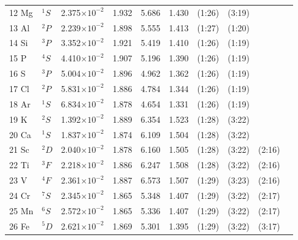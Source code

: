 \begin{longtable}{l l r r r r r r r r}
12 Mg 	&  	$^{1}S$  	&   	2.375$\times10^{-2}$   	&    	1.932    	&    	5.686    	&    	1.430    	&    	(1:26)    	&    	(3:19)    	\\
13 Al 	&  	$^{2}P$  	&   	2.239$\times10^{-2}$   	&    	1.898    	&    	5.555    	&    	1.413    	&    	(1:27)    	&    	(1:20)    	 \\
14 Si 	&  	$^{3}P$  	&   	3.352$\times10^{-2}$   	&    	1.921    	&    	5.419    	&    	1.410    	&    	(1:26)    	&    	(1:19)    	 \\
15 P 		&  	$^{4}S$  	&   	4.410$\times10^{-2}$   	&    	1.907    	&    	5.196    	&    	1.390    	&    	(1:26)    	&    	(1:19)    	    \\
16 S 		&  	$^{3}P$  	&   	5.004$\times10^{-2}$   	&    	1.896    	&    	4.962    	&    	1.362    	&    	(1:26)    	&    	(1:19)    	    \\
17 Cl 	&  	$^{2}P$  	&   	5.831$\times10^{-2}$   	&    	1.886    	&    	4.784    	&    	1.344    	&    	(1:26)    	&    	(1:19)    	    \\
18 Ar 	&  	$^{1}S$   	&   	6.834$\times10^{-2}$   	&    	1.878    	&    	4.654    	&    	1.331    	&    	(1:26)    	&    	(1:19)    	    \\
19 K 		&  	$^{2}S$   	&   	1.392$\times10^{-2}$   	&    	1.889    	&    	6.354    	&    	1.523    	&    	(1:28)    	&    	(3:22)    	    \\
20 Ca 	&  	$^{1}S$   	&   	1.837$\times10^{-2}$   	&    	1.874    	&    	6.109    	&    	1.504    	&    	(1:28)    	&    	(3:22)    	    \\
21 Sc 	&  	$^{2}D$   	&   	2.040$\times10^{-2}$   	&    	1.878    	&    	6.160    	&    	1.505    	&    	(1:28)    	&    	(3:22)    	&    	(2:16)   \\
22 Ti 	&  	$^{3}F$   	&   	2.218$\times10^{-2}$   	&    	1.886    	&    	6.247    	&    	1.508    	&    	(1:28)    	&    	(3:22)    	&    	(2:16)   \\
23 V 		&  	$^{4}F$   	&   	2.361$\times10^{-2}$   	&    	1.887    	&    	6.573    	&    	1.507    	&    	(1:29)    	&    	(3:23)    	&    	(2:16)   \\
24 Cr 	&  	$^{7}S$   	&   	2.345$\times10^{-2}$   	&    	1.865    	&    	5.348    	&    	1.407    	&    	(1:29)    	&    	(3:22)    	&    	(2:17)   \\
25 Mn 	&  	$^{6}S$   	&   	2.572$\times10^{-2}$   	&    	1.865    	&    	5.336    	&    	1.407    	&    	(1:29)    	&    	(3:22)    	&    	(2:17)   \\
26 Fe 	&  	$^{5}D$   	&   	2.621$\times10^{-2}$   	&    	1.869    	&    	5.301    	&    	1.395    	&    	(1:29)    	&    	(3:22)    	&    	(3:17)   \\

\end{longtable}
